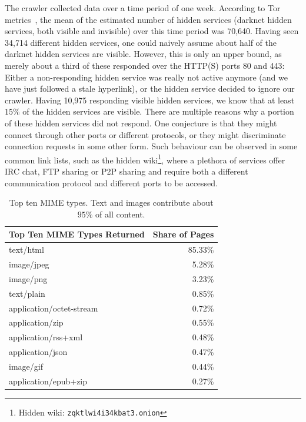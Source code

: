 The crawler collected data over a time period of one week. According to Tor metrics~\cite{TorMetricsOnion}, the mean of the estimated number of hidden services (darknet hidden services, both visible and invisible) over this time period was 70,640. Having seen 34,714 different hidden services, one could naively assume about half of the darknet hidden services are visible. However, this is only an upper bound, as merely about a third of these responded over the HTTP(S) ports 80 and 443: Either a non-responding hidden service was really not active anymore (and we have just followed a stale hyperlink), or the hidden service decided to ignore our crawler. Having 10,975 responding visible hidden services, we know that at least $15\%$ of the hidden services are visible.
There are multiple reasons why a portion of these hidden services did not respond. One conjecture is that they might connect through other ports or different protocols, or they might discriminate connection requests in some other form.
Such behaviour can be observed in some common link lists, such as the hidden wiki\footnote{Hidden wiki: \texttt{zqktlwi4i34kbat3.onion}}, where a plethora of services offer IRC chat, FTP sharing or P2P sharing and require both a different communication protocol and different ports to be accessed.
\iflncs
  \begin{table}
    \vspace{-10pt}
    \begin{tabular}{l|r}
      \hline
       \textbf{Top Ten MIME Types Returned} & \textbf{Share of Pages} \\
       \hline
       \hline
      text/html     & 85.33\% \\
      \hline
      image/jpeg      & 5.28\% \\
      \hline
      image/png     & 3.23\% \\
      \hline
      text/plain      & 0.85\% \\
      \hline
      application/octet-stream    & 0.72\% \\
      \hline
      application/zip   & 0.55\% \\
      \hline
      application/rss+xml & 0.48\% \\
      \hline
      application/json  & 0.47\% \\
      \hline
      image/gif     & 0.44\% \\
      \hline
      application/epub+zip      & 0.27\% \\
      \hline
    \end{tabular}
    \caption{Top ten MIME types. Text and images contribute about $95\%$ of all content.}
    \label{table:mime_types}
  \end{table}
